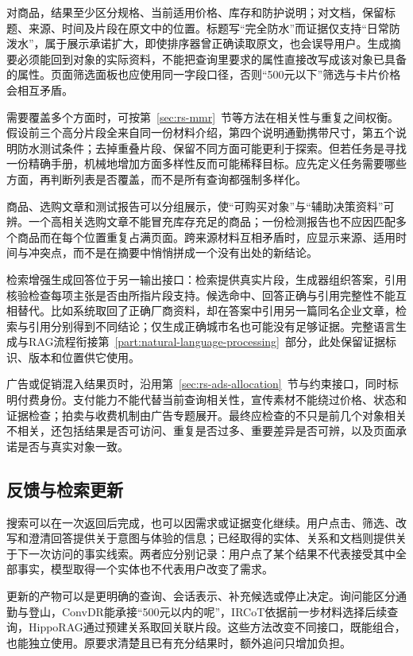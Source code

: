 对商品，结果至少区分规格、当前适用价格、库存和防护说明；对文档，保留标题、来源、时间及片段在原文中的位置。标题写“完全防水”而证据仅支持“日常防泼水”，属于展示承诺扩大，即使排序器曾正确读取原文，也会误导用户。生成摘要必须能回到对象的实际资料，不能把查询里要求的属性直接改写成该对象已具备的属性。页面筛选面板也应使用同一字段口径，否则“500元以下”筛选与卡片价格会相互矛盾。

需要覆盖多个方面时，可按第~\ref{sec:rs-mmr}~节等方法在相关性与重复之间权衡。假设前三个高分片段全来自同一份材料介绍，第四个说明通勤携带尺寸，第五个说明防水测试条件；去掉重叠片段、保留不同方面可能更利于探索。但若任务是寻找一份精确手册，机械地增加方面多样性反而可能稀释目标。应先定义任务需要哪些方面，再判断列表是否覆盖，而不是所有查询都强制多样化。

商品、选购文章和测试报告可以分组展示，使“可购买对象”与“辅助决策资料”可辨。一个高相关选购文章不能冒充库存充足的商品；一份检测报告也不应因匹配多个商品而在每个位置重复占满页面。跨来源材料互相矛盾时，应显示来源、适用时间与冲突点，而不是在摘要中悄悄拼成一个没有出处的新结论。

检索增强生成回答位于另一输出接口：检索提供真实片段，生成器组织答案，引用核验检查每项主张是否由所指片段支持。候选命中、回答正确与引用完整性不能互相替代。比如系统取回了正确厂商资料，却在答案中引用另一篇同名企业文章，检索与引用分别得到不同结论；仅生成正确城市名也可能没有足够证据。完整语言生成与RAG流程衔接第~\ref{part:natural-language-processing}~部分，此处保留证据标识、版本和位置供它使用。

广告或促销混入结果页时，沿用第~\ref{sec:rs-ads-allocation}~节与约束接口，同时标明付费身份。支付能力不能代替当前查询相关性，宣传素材不能绕过价格、状态和证据检查；拍卖与收费机制由广告专题展开。最终应检查的不只是前几个对象相关不相关，还包括结果是否可访问、重复是否过多、重要差异是否可辨，以及页面承诺是否与真实对象一致。

\subsection{反馈与检索更新}
\label{sec:rs-search-feedback}

搜索可以在一次返回后完成，也可以因需求或证据变化继续。用户点击、筛选、改写和澄清回答提供关于意图与体验的信息；已经取得的实体、关系和文档则提供关于下一次访问的事实线索。两者应分别记录：用户点了某个结果不代表接受其中全部事实，模型取得一个实体也不代表用户改变了需求。

更新的产物可以是更明确的查询、会话表示、补充候选或停止决定。询问能区分通勤与登山，ConvDR能承接“500元以内的呢”，IRCoT依据前一步材料选择后续查询，HippoRAG通过预建关系取回关联片段。这些方法改变不同接口，既能组合，也能独立使用。原要求清楚且已有充分结果时，额外追问只增加负担。


